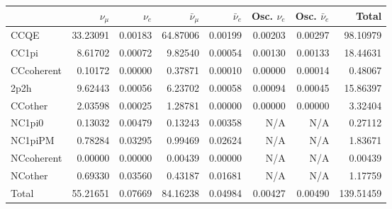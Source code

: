 \begin{tabular} { | l ||r | r | r | r | r | r | | r | }
\hline
              & $\nu_\mu$            & $\nu_e$              & $\bar{\nu}_{\mu}$    & $\bar{\nu}_{e}$      & Osc. $\nu_e$         & Osc. $\bar{\nu}_{e}$ & Total                \\ \hline\hline
 CCQE         & 33.23091             & 0.00183              & 64.87006             & 0.00199              & 0.00203              & 0.00297              & 98.10979             \\ \hline
 CC1pi        & 8.61702              & 0.00072              & 9.82540              & 0.00054              & 0.00130              & 0.00133              & 18.44631             \\ \hline
 CCcoherent   & 0.10172              & 0.00000              & 0.37871              & 0.00010              & 0.00000              & 0.00014              & 0.48067              \\ \hline
 2p2h         & 9.62443              & 0.00056              & 6.23702              & 0.00058              & 0.00094              & 0.00045              & 15.86397             \\ \hline
 CCother      & 2.03598              & 0.00025              & 1.28781              & 0.00000              & 0.00000              & 0.00000              & 3.32404              \\ \hline
 NC1pi0       & 0.13032              & 0.00479              & 0.13243              & 0.00358              & N/A                  & N/A                  & 0.27112              \\ \hline
 NC1piPM      & 0.78284              & 0.03295              & 0.99469              & 0.02624              & N/A                  & N/A                  & 1.83671              \\ \hline
 NCcoherent   & 0.00000              & 0.00000              & 0.00439              & 0.00000              & N/A                  & N/A                  & 0.00439              \\ \hline
 NCother      & 0.69330              & 0.03560              & 0.43187              & 0.01681              & N/A                  & N/A                  & 1.17759              \\ \hline
\hline
 Total        & 55.21651             & 0.07669              & 84.16238             & 0.04984              & 0.00427              & 0.00490              & 139.51459            \\ \hline

\end{tabular}

